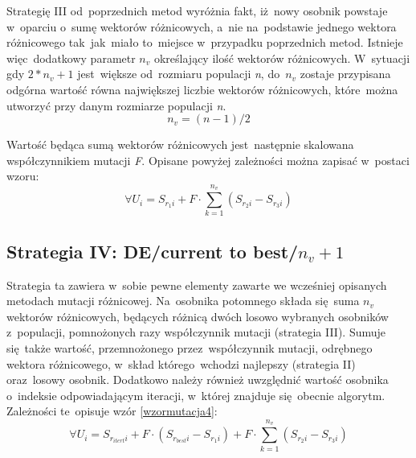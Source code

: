 Strategię III od~poprzednich metod wyróżnia fakt, iż~nowy osobnik powstaje w~oparciu o~sumę wektorów różnicowych, a~nie na~podstawie jednego wektora różnicowego tak~jak~miało to~miejsce w~przypadku poprzednich metod. Istnieje więc~dodatkowy parametr $n_{v}$ określający ilość wektorów różnicowych. W~sytuacji gdy $ 2 * n_{v} + 1$ jest~większe od~rozmiaru populacji \textsl{n}, do~$n_{v}$ zostaje przypisana odgórna wartość równa największej liczbie wektorów różnicowych, które~można utworzyć przy danym rozmiarze populacji \textsl{n}.\\
\begin{equation}
 n_{v} = (n - 1) / 2
\end{equation}

Wartość będąca sumą wektorów różnicowych jest~następnie skalowana współczynnikiem mutacji \textsl{F}. Opisane powyżej zależności można zapisać w~postaci wzoru:\\
\begin{equation}
 \forall U_{i} =S_{r_{1}i} +  F \cdot \sum_{k=1}^{n_{v}}(S_{r_{2}i} - S_{r_{3}i})
\end{equation}

\subsection{Strategia IV: DE/current to best/$n_{v} +1$}\label{sec:narzedzia}


Strategia ta zawiera w~sobie pewne elementy zawarte we wcześniej opisanych metodach mutacji różnicowej. Na~osobnika potomnego składa się~suma $n_{v}$ wektorów różnicowych, będących różnicą dwóch losowo wybranych osobników z~populacji, pomnożonych razy współczynnik mutacji (strategia III). Sumuje się~także wartość, przemnożonego przez~współczynnik mutacji, odrębnego wektora różnicowego, w~skład którego~wchodzi najlepszy (strategia II) oraz~losowy osobnik. Dodatkowo należy również uwzględnić wartość osobnika o~indeksie odpowiadającym iteracji, w~której znajduje się~obecnie algorytm. Zależności te~opisuje wzór \ref{wzormutacja4}:\\

\begin{equation}
 \forall U_{i} = S_{r_{itert}i} +  F \cdot (S_{r_{best}i} - S_{r_{1}i}) +  F \cdot \sum_{k=1}^{n_{v}}(S_{r_{2}i} - S_{r_{3}i})
\label {wzormutacja4}
\end{equation}

